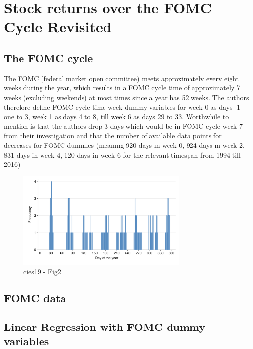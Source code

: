 \chapter{Stock returns over the FOMC Cycle Revisited }


\section{The FOMC cycle}

The FOMC (federal market open committee) meets approximately every eight weeks during the year, which results in a FOMC cycle time of approximately 7 weeks (excluding weekends) at most times since a year has 52 weeks.
The authors therefore define FOMC cycle time week dummy variables for week 0 as days -1 one to 3, week 1 as days 4 to 8,  till week 6 as days 29 to 33. Worthwhile to mention is that the authors drop 3 days which would be in FOMC cycle week 7 from their investigation and that the number of available data points for decreases for FOMC dummies (meaning 920 days in week 0, 924 days in week 2, 831 days in week 4, 120 days in week 6 for the relevant timespan from 1994 till 2016)

\label{cies19_fig2}
\begin{figure}[h]
    \centering
    \includegraphics[width=0.75\textwidth]{figures/cies19/fig2}
    \caption{cies19 - Fig2}
\end{figure}


\section{FOMC data}

\section{Linear Regression with FOMC dummy variables}

